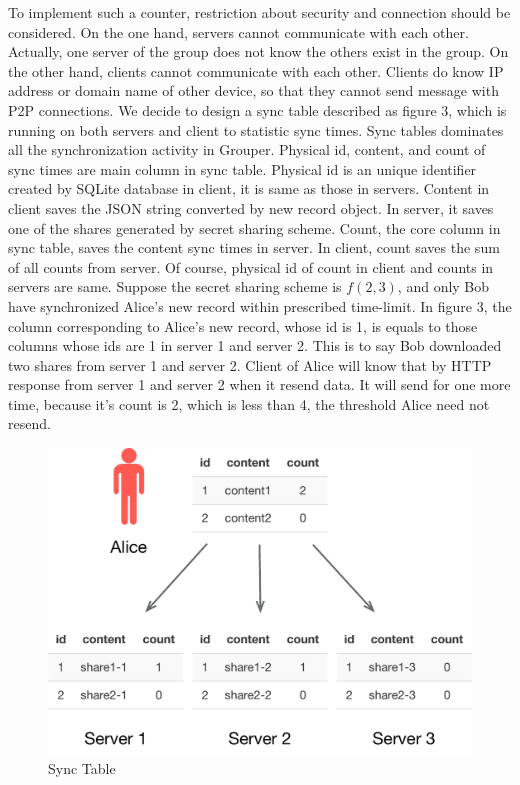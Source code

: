 \documentclass[twocolumn,10pt]{article}
\begin{document}
To implement such a counter, restriction about security and connection should be considered. On the one hand, servers cannot communicate with each other. Actually, one server of the group does not know the others exist in the group. On the other hand, clients cannot communicate with each other. Clients do know IP address or domain name of other device, so that they cannot send message with P2P connections. We decide to design a sync table described as figure 3, which is running on both servers and client to statistic sync times. Sync tables dominates all the synchronization activity in Grouper. Physical id, content, and count of sync times are main column in sync table. Physical id is an unique identifier created by SQLite database in client, it is same as those in servers. Content in client saves the JSON string converted by new record object. In server, it saves one of the shares generated by secret sharing scheme. Count, the core column in sync table, saves the content sync times in server. In client, count saves the sum of all counts from server. Of course, physical id of count in client and counts in servers are same. Suppose the secret sharing scheme is $f(2, 3)$, and only Bob have synchronized Alice's new record within prescribed time-limit. In figure 3, the column corresponding to Alice's new record, whose id is 1, is equals to those columns whose ids are 1 in server 1 and server 2. This is to say Bob downloaded two shares from server 1 and server 2. Client of Alice will know that by HTTP response from server 1 and server 2 when it resend data. It will send for one more time, because it's count is 2, which is less than 4, the threshold Alice need not resend.

\begin{figure}[t]
\centering
\includegraphics[scale=0.4]{sync_table}
\caption{Sync Table}
\end{figure}
\end{document}
